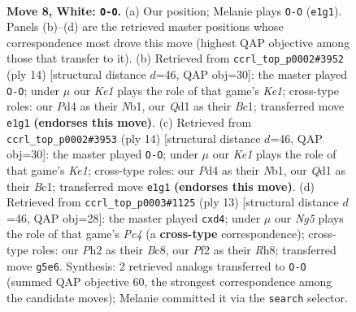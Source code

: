\documentclass[11pt]{article}
\begin{document}
\begin{figure}[p]\centering
\begin{subfigure}{0.46\textwidth}\centering
\resizebox{\linewidth}{!}{%
\newchessgame
\chessboard[
  setfen={rnbqk2r/ppp1ppbp/1n4p1/3pP1N1/3P4/1B6/PPP2PPP/RNBQK2R w KQkq - 0 8},
  showmover=false,
  pgfstyle=straightmove, color=movearrow, markmove={e1-g1}
]}
\caption{}
\end{subfigure}\hfill
\begin{subfigure}{0.46\textwidth}\centering
\resizebox{\linewidth}{!}{%
\newchessgame
\chessboard[
  setfen={rn1qk2r/ppp1ppbp/4b1p1/3nN3/3P4/1B6/PPP2PPP/RNBQK2R w KQkq - 4 8},
  showmover=false,
  pgfstyle=straightmove, color=movearrow, markmove={e1-g1}
]}
\caption{}
\end{subfigure}
\\[4pt]
\begin{subfigure}{0.46\textwidth}\centering
\resizebox{\linewidth}{!}{%
\newchessgame
\chessboard[
  setfen={rn1qk2r/ppp1ppbp/4b1p1/3nN3/3P4/1B6/PPP2PPP/RNBQK2R w KQkq - 4 8},
  showmover=false,
  pgfstyle=straightmove, color=movearrow, markmove={e1-g1}
]}
\caption{}
\end{subfigure}\hfill
\begin{subfigure}{0.46\textwidth}\centering
\resizebox{\linewidth}{!}{%
\newchessgame
\chessboard[
  setfen={rnbqkb1r/pp3ppp/4p3/2pn4/3P4/1P2PN2/PB3PPP/RN1QKB1R b KQkq - 1 7},
  showmover=false,
  pgfstyle=straightmove, color=movearrow, markmove={c5-d4}
]}
\caption{}
\end{subfigure}
\caption{\textbf{Move 8, White: \texttt{O-O}.} (a) Our position; Melanie plays \texttt{O-O} (\texttt{e1g1}). Panels (b)--(d) are the retrieved master positions whose correspondence most drove this move (highest QAP objective among those that transfer to it). (b) Retrieved from \texttt{ccrl\_top\_p0002\#3952} (ply 14) [structural distance $d$=46, QAP obj=30]: the master played \texttt{O-O}; under $\mu$ our \emph{Ke1} plays the role of that game's \emph{Ke1}; cross-type roles: our \emph{P}d4 as their \emph{N}b1, our \emph{Q}d1 as their \emph{B}c1; transferred move \texttt{e1g1} \textbf{(endorses this move)}. (c) Retrieved from \texttt{ccrl\_top\_p0002\#3953} (ply 14) [structural distance $d$=46, QAP obj=30]: the master played \texttt{O-O}; under $\mu$ our \emph{Ke1} plays the role of that game's \emph{Ke1}; cross-type roles: our \emph{P}d4 as their \emph{N}b1, our \emph{Q}d1 as their \emph{B}c1; transferred move \texttt{e1g1} \textbf{(endorses this move)}. (d) Retrieved from \texttt{ccrl\_top\_p0003\#1125} (ply 13) [structural distance $d$=46, QAP obj=28]: the master played \texttt{cxd4}; under $\mu$ our \emph{Ng5} plays the role of that game's \emph{Pc4} (a \textbf{cross-type} correspondence); cross-type roles: our \emph{P}h2 as their \emph{B}c8, our \emph{P}f2 as their \emph{R}h8; transferred move \texttt{g5e6}. Synthesis: 2 retrieved analogs transferred to \texttt{O-O} (summed QAP objective 60, the strongest correspondence among the candidate moves); Melanie committed it via the \texttt{search} selector.}
\label{fig:thought-m14}
\end{figure}
\end{document}
